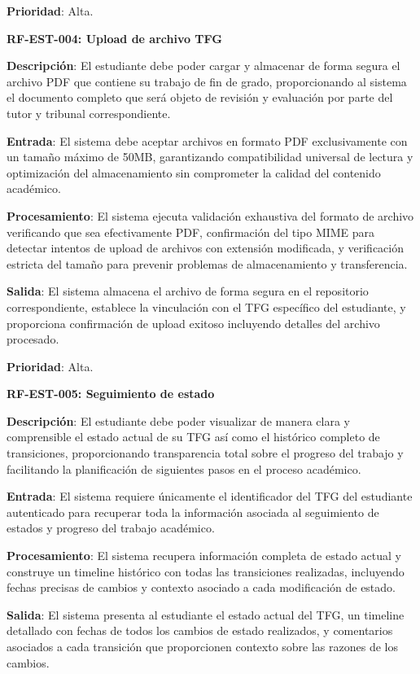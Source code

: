 \documentclass[12pt,a4paper,oneside]{report}
\begin{document}
\textbf{Prioridad}: Alta.

\textbf{RF-EST-004: Upload de archivo TFG}

\textbf{Descripción}: El estudiante debe poder cargar y almacenar de forma segura el archivo PDF que contiene su trabajo de fin de grado, proporcionando al sistema el documento completo que será objeto de revisión y evaluación por parte del tutor y tribunal correspondiente.

\textbf{Entrada}: El sistema debe aceptar archivos en formato PDF exclusivamente con un tamaño máximo de 50MB, garantizando compatibilidad universal de lectura y optimización del almacenamiento sin comprometer la calidad del contenido académico.

\textbf{Procesamiento}: El sistema ejecuta validación exhaustiva del formato de archivo verificando que sea efectivamente PDF, confirmación del tipo MIME para detectar intentos de upload de archivos con extensión modificada, y verificación estricta del tamaño para prevenir problemas de almacenamiento y transferencia.

\textbf{Salida}: El sistema almacena el archivo de forma segura en el repositorio correspondiente, establece la vinculación con el TFG específico del estudiante, y proporciona confirmación de upload exitoso incluyendo detalles del archivo procesado.

\textbf{Prioridad}: Alta.

\textbf{RF-EST-005: Seguimiento de estado}

\textbf{Descripción}: El estudiante debe poder visualizar de manera clara y comprensible el estado actual de su TFG así como el histórico completo de transiciones, proporcionando transparencia total sobre el progreso del trabajo y facilitando la planificación de siguientes pasos en el proceso académico.

\textbf{Entrada}: El sistema requiere únicamente el identificador del TFG del estudiante autenticado para recuperar toda la información asociada al seguimiento de estados y progreso del trabajo académico.

\textbf{Procesamiento}: El sistema recupera información completa de estado actual y construye un timeline histórico con todas las transiciones realizadas, incluyendo fechas precisas de cambios y contexto asociado a cada modificación de estado.

\textbf{Salida}: El sistema presenta al estudiante el estado actual del TFG, un timeline detallado con fechas de todos los cambios de estado realizados, y comentarios asociados a cada transición que proporcionen contexto sobre las razones de los cambios.
\end{document}
